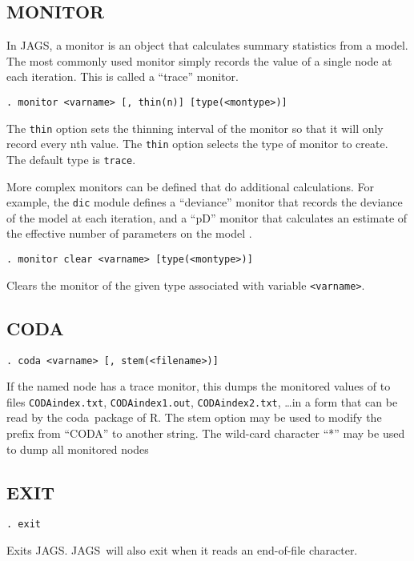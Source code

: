 \documentclass[11pt, a4paper, titlepage]{report}
\newcommand{\JAGS}{\textsf{JAGS}}
\newcommand{\R}{\textsf{R}}
\newcommand{\CODA}{\textsf{coda}}
\begin{document}
\subsection{MONITOR}
\label{section:monitor}

In \JAGS, a monitor is an object that calculates summary statistics
from a model.  The most commonly used monitor simply records the value
of a single node at each iteration.  This is called a ``trace''
monitor. 
\begin{verbatim}
. monitor <varname> [, thin(n)] [type(<montype>)]
\end{verbatim}
The \texttt{thin} option sets the thinning interval of the monitor so
that it will only record every nth value. The \texttt{thin} option 
selects the type of monitor to create. The default type is \texttt{trace}.

More complex monitors can be defined that do additional calculations.
For example, the \verb+dic+ module defines a ``deviance'' monitor that
records the deviance of the model at each iteration, and a ``pD''
monitor that calculates an estimate of the effective number of
parameters on the model \cite{spiegelhalter:etal:2002}.  

\begin{verbatim}
. monitor clear <varname> [type(<montype>)]
\end{verbatim}
Clears the monitor of the given type associated with variable
\texttt{<varname>}. 

\subsection{CODA}
\label{coda}

\begin{verbatim}
. coda <varname> [, stem(<filename>)]
\end{verbatim}
If the named node has a trace monitor, this dumps the monitored values
of to files \texttt{CODAindex.txt}, \texttt{CODAindex1.out},
\texttt{CODAindex2.txt}, \ldots in a form that can be read by the
\CODA\ package of \R.  The stem option may be used to modify the
prefix from ``CODA'' to another string.  The wild-card character ``*''
may be used to dump all monitored nodes

\subsection{EXIT}

\begin{verbatim}
. exit
\end{verbatim}
Exits \JAGS. \JAGS\ will also exit when it reads an end-of-file character.
\end{document}
